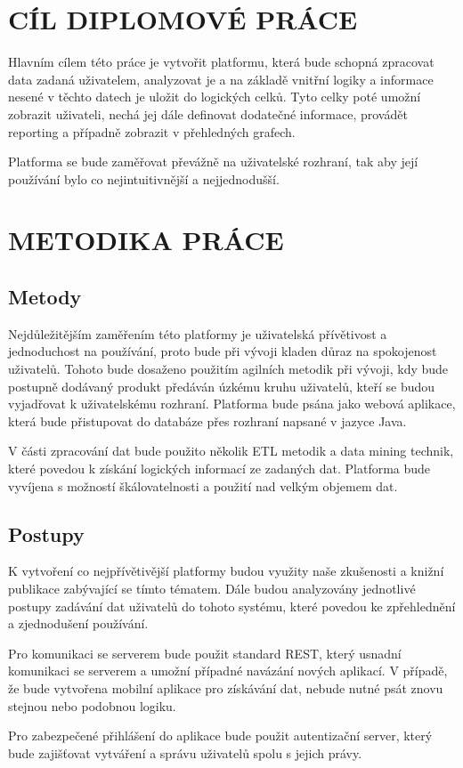 \chapter*{CÍL DIPLOMOVÉ PRÁCE}
Hlavním cílem této práce je vytvořit platformu, která bude schopná zpracovat data zadaná uživatelem, analyzovat je a na základě vnitřní logiky a informace nesené v těchto datech je uložit do logických celků. Tyto celky poté umožní zobrazit uživateli, nechá jej dále definovat dodatečné informace, provádět reporting a případně zobrazit v přehledných grafech.

Platforma se bude zaměřovat převážně na uživatelské rozhraní, tak aby její používání bylo co nejintuitivnější a nejjednodušší.

\chapter*{METODIKA PRÁCE}
\section*{Metody}
\par Nejdůležitějším zaměřením této platformy je uživatelská přívětivost a jednoduchost na používání, proto bude při vývoji kladen důraz na spokojenost uživatelů. Tohoto bude dosaženo použitím agilních metodik při vývoji, kdy bude postupně dodávaný produkt předáván úzkému kruhu uživatelů, kteří se budou vyjadřovat k uživatelskému rozhraní. Platforma bude psána jako webová aplikace, která bude přistupovat do databáze přes rozhraní napsané v jazyce Java.
\par V části zpracování dat bude použito několik ETL metodik a data mining technik, které povedou k získání logických informací ze zadaných dat. Platforma bude vyvíjena s možností 
škálovatelnosti a použití nad velkým objemem dat.

\section*{Postupy}
\par K vytvoření co nejpřívětivější platformy budou využity naše zkušenosti a knižní publikace zabývající se tímto tématem. Dále budou analyzovány jednotlivé postupy zadávání dat uživatelů do tohoto systému, které povedou ke zpřehlednění a zjednodušení používání.
\par Pro komunikaci se serverem bude použit standard REST, který usnadní komunikaci se serverem a umožní případné navázání nových aplikací. V případě, že bude vytvořena mobilní aplikace pro získávání dat, nebude nutné psát znovu stejnou nebo podobnou logiku.
\par Pro zabezpečené přihlášení do aplikace bude použit autentizační server, který bude zajišťovat vytváření a správu uživatelů spolu s jejich právy.

